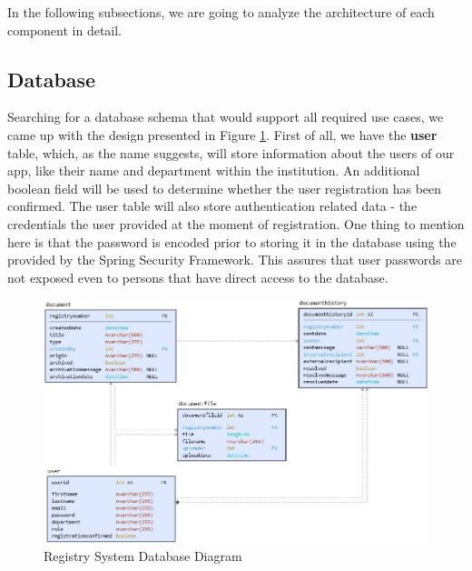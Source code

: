 In the following subsections, we are going to analyze the architecture of each component in detail.



\subsection{Database}
\label{subsection:dbLayer}

Searching for a database schema that would support all required use cases, we came up with the design presented in Figure \ref{db}. First of all, we have the \textbf{user} table, which, as the name suggests, will store information about the users of our app, like their name and department within the institution. An additional boolean field will be used to determine whether the user registration has been confirmed. The user table will also store authentication related data - the credentials the user provided at the moment of registration. One thing to mention here is that the password is encoded prior to storing it in the database using the  provided by the Spring Security Framework. This assures that user passwords are not exposed even to persons that have direct access to the database.

\begin{figure}[H]
    \centering
    \includegraphics[width=6in]{images/db}
    \caption{Registry System Database Diagram}
    \label{db}
\end{figure}


